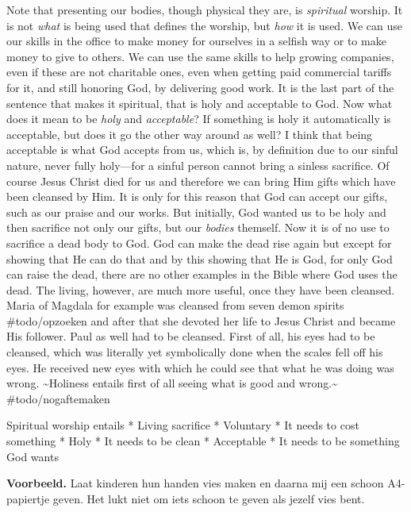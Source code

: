 Note that presenting our bodies, though physical they are, is
\emph{spiritual} worship. It is not \emph{what} is being used that
defines the worship, but \emph{how} it is used. We can use our skills in
the office to make money for ourselves in a selfish way or to make money
to give to others. We can use the same skills to help growing companies,
even if these are not charitable ones, even when getting paid commercial
tariffs for it, and still honoring God, by delivering good work. It is
the last part of the sentence that makes it spiritual, that is holy and
acceptable to God. Now what does it mean to be \emph{holy} and
\emph{acceptable}? If something is holy it automatically is acceptable,
but does it go the other way around as well? I think that being
acceptable is what God accepts from us, which is, by definition due to
our sinful nature, never fully holy---for a sinful person cannot bring a
sinless sacrifice. Of course Jesus Christ died for us and therefore we
can bring Him gifts which have been cleansed by Him. It is only for this
reason that God can accept our gifts, such as our praise and our works.
But initially, God wanted us to be holy and then sacrifice not only our
gifts, but our \emph{bodies} themself. Now it is of no use to sacrifice
a dead body to God. God can make the dead rise again but except for
showing that He can do that and by this showing that He is God, for only
God can raise the dead, there are no other examples in the Bible where
God uses the dead. The living, however, are much more useful, once they
have been cleansed. Maria of Magdala for example was cleansed from seven
demon spirits \#todo/opzoeken and after that she devoted her life to
Jesus Christ and became His follower. Paul as well had to be cleansed.
First of all, his eyes had to be cleansed, which was literally yet
symbolically done when the scales fell off his eyes. He received new
eyes with which he could see that what he was doing was wrong.
\textasciitilde Holiness entails first of all seeing what is good and
wrong.\textasciitilde{} \#todo/nogaftemaken

Spiritual worship entails * Living sacrifice * Voluntary * It needs to
cost something * Holy * It needs to be clean * Acceptable * It needs to
be something God wants

\textbf{Voorbeeld.} Laat kinderen hun handen vies maken en daarna mij
een schoon A4-papiertje geven. Het lukt niet om iets schoon te geven als
jezelf vies bent.

